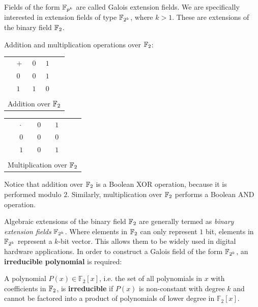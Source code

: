Fields of the form ${\mathbb{F}}_{p^{k}}$ are called Galois extension fields.
We are specifically interested in extension fields of type 
${\mathbb{F}}_{2^k}$, where $k > 1$. These are extensions of the binary
field ${\mathbb{F}}_2$.
\begin{Example}
Addition and multiplication operations over ${\mathbb{F}}_2$:
\begin{table}[!h]
	\centering
	\begin{tabular}{m{1cm}|l|ll|m{1cm}}
	\hhline{~---~}
	\multirow{3}{*}{} & $+$ & $0$ & $1$ & \multirow{3}{*}{} \\
	\hhline{~---~}
	& $0$ & $0$ & $1$ & \\
	& $1$ & $1$ & $0$ & \\
	\hhline{~---~}
	\multicolumn{5}{c}{}\\
	\multicolumn{5}{c}{Addition over ${\mathbb{F}}_2$}\\
	\end{tabular}
	\quad
	\begin{tabular}{m{1cm}|l|ll|m{1cm}}
	\hhline{~---~}
	\multirow{3}{*}{} & $\cdot$ & $0$ & $1$ & \multirow{3}{*}{} \\
	\hhline{~---~}
	& $0$ & $0$ & $0$ & \\
	& $1$ & $0$ & $1$ & \\
	\hhline{~---~}
	\multicolumn{5}{c}{}\\
	\multicolumn{5}{c}{Multiplication over ${\mathbb{F}}_2$}\\
	\end{tabular}
\end{table}

Notice that addition over ${\mathbb{F}}_2$ is a Boolean {\sc XOR} operation, 
because it is performed modulo $2$.
Similarly, multiplication over ${\mathbb{F}}_2$ performs a Boolean {\sc AND} operation.
\end{Example}

Algebraic extensions of the binary field ${\mathbb{F}}_{2}$  
are generally termed as {\it binary extension fields} ${\mathbb{F}}_{2^k}$.
Where elements in ${\mathbb{F}}_2$ can only represent $1$ bit, elements in ${\mathbb{F}}_{2^k}$ 
represent a $k$-bit vector.
This allows them to be widely used in digital hardware applications.
In order to construct a Galois field of the form ${\mathbb{F}}_{2^k}$, 
an {\bf irreducible polynomial} is required:
\begin{Definition}
A polynomial $P(x) \in \mathbb{F}_{2}\left[x\right]$, i.e. the set of all 
polynomials in $x$ with coefficients in ${\mathbb{F}}_2$, is {\bf irreducible} 
if $P(x)$ is non-constant with degree $k$ and cannot be 
factored into a product of polynomials of lower degree in $\mathbb{F}_2[x]$.
\end{Definition}

